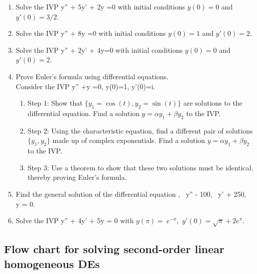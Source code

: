 \documentclass[12pt]{book}
\begin{document}
\begin{enumerate}

\item
  Solve the IVP
   y'' + 5y' + 2y =0
  \eee
  with initial conditions $y(0)=0$ and $y'(0)=3/2$.

\item
  Solve the IVP
   y'' + 8y =0
  \eee
  with initial conditions $y(0)=1$ and $y'(0)=2$.

\item
  Solve the IVP
  \bee
  y'' + 2y' + 4y=0
  \eee
  with initial conditions $y(0)=0$ and $y'(0)=2$.

\item
  Prove Euler's formula using differential equations. \\
  Consider the IVP
  \bee
  y'' +y =0, \qquad y(0)=1, \quad y'(0)=i.
  \eee
  \begin{enumerate}
    \item Step 1: Show that $\{y_1=\cos(t),y_2=\sin(t)\}$ are solutions
      to the differential equation. Find a solution $y=\alpha y_1 + \beta y_2$
      to the IVP.
    \item Step 2: Using the characteristic equation, find a different pair
      of solutions $\{y_1,y_2\}$ made up of complex exponentials. Find a
      solution $y=\alpha y_1 + \beta y_2$ to the IVP.
    \item Step 3: Use a theorem to show that these two solutions must be
      identical, thereby proving Euler's formula.
  \end{enumerate}

\item
  Find the general solution of the differential equation
  ,  \, y'' - 100,  \, y' + 250,  \, y = 0.
  \eee


\item
  Solve the IVP
  \bee
  y'' + 4y' + 5y = 0
  \eee
  with $y(\pi) =\ e^{-\pi},$ $y' (0) = \sqrt{\pi} + 2e^\pi$.

\end{enumerate}

\newpage
\subsection{Flow chart for solving second-order linear homogeneous DEs}
\end{document}
